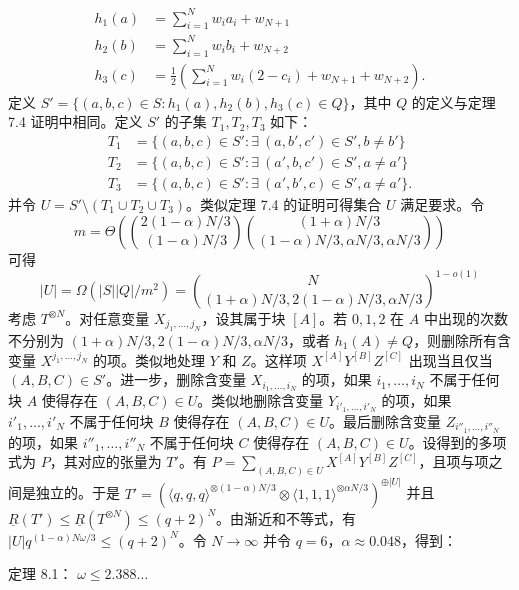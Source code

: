 \documentclass[11pt,fleqn, UTF8]{ctexbook} %
\begin{document}
\begin{align}
h_1(a)&=\sum_{i=1}^N w_i a_i+w_{N+1}\\
h_2(b)&=\sum_{i=1}^N w_i b_i+w_{N+2}\\
h_3(c)&=\frac{1}{2}\left( \sum_{i=1}^N w_i(2-c_i)+w_{N+1}+w_{N+2} \right).
\end{align}
定义 $S'=\{(a,b,c)\in S: h_1(a),h_2(b),h_3(c)\in Q\}$，其中 $Q$ 的定义与定理 7.4 证明中相同。定义 $S'$ 的子集 $T_1,T_2,T_3$ 如下：
\begin{align}
T_1&=\{(a,b,c)\in S': \exists~(a,b',c')\in S', b\neq b'\}\\
T_2&=\{(a,b,c)\in S': \exists~(a',b,c')\in S', a\neq a'\}\\
T_3&=\{(a,b,c)\in S': \exists~(a',b',c)\in S', a\neq a'\}.
\end{align}
并令 $U=S'\setminus (T_1\cup T_2\cup T_3)$。类似定理 7.4 的证明可得集合 $U$ 满足要求。令
\begin{equation*}
  m=\Theta\left({2(1-\alpha)N/3\choose (1-\alpha)N/3}{(1+\alpha)N/3 \choose (1-\alpha)N/3, \alpha N/3, \alpha N/3}\right)
\end{equation*}
可得
\begin{equation*}
  |U|=\Omega(|S||Q|/m^2)={N\choose (1+\alpha)N/3, 2(1-\alpha)N/3, \alpha N/3}^{1-o(1)}
\end{equation*}
考虑 $T^{\otimes N}$。对任意变量 $X_{j_1,\dots,j_N}$，设其属于块 $[A]$。若 $0,1,2$ 在 $A$ 中出现的次数不分别为 $(1+\alpha)N/3, 2(1-\alpha)N/3, \alpha N/3$，或者 $h_1(A)\neq Q$，则删除所有含变量 $X^{j_1,\dots,j_N}$ 的项。类似地处理 $Y$ 和 $Z$。这样项 $X^{[A]}Y^{[B]}Z^{[C]}$ 出现当且仅当 $(A,B,C)\in S'$。进一步，删除含变量 $X_{i_1,\dots,i_N}$ 的项，如果 ${i_1,\dots,i_N}$ 不属于任何块 $A$ 使得存在 $(A,B,C)\in U$。类似地删除含变量 $Y_{i'_1,\dots,i'_N}$ 的项，如果 ${i'_1,\dots,i'_N}$ 不属于任何块 $B$ 使得存在 $(A,B,C)\in U$。最后删除含变量 $Z_{i''_1,\dots,i''_N}$ 的项，如果 ${i''_1,\dots,i''_N}$ 不属于任何块 $C$ 使得存在 $(A,B,C)\in U$。设得到的多项式为 $P$，其对应的张量为 $T'$。有 $P=\sum_{(A,B,C)\in U} X^{[A]}Y^{[B]}Z^{[C]}$，且项与项之间是独立的。于是 $T'=\left(\langle q,q,q\rangle^{\otimes (1-\alpha)N/3}\otimes \langle 1,1,1\rangle^{\otimes \alpha N/3}\right)^{\oplus |U|}$ 并且 $\underline{R}(T')\leq \underline{R}\left(T^{\otimes N}\right)\leq (q+2)^N$。由渐近和不等式，有 $|U|q^{(1-\alpha)N\omega/3}\leq (q+2)^N$。令 $N\to\infty$ 并令 $q=6$，$\alpha\approx 0.048$，得到：

定理 8.1\cite{coppersmith1990matrix}：
$\omega \leq 2.388\dots$
\end{document}

